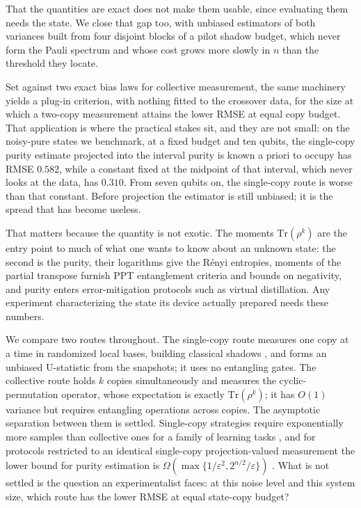 That the quantities are exact does not make them usable, since evaluating them needs the state.
We close that gap too, with unbiased estimators of both variances built from four disjoint blocks
of a pilot shadow budget, which never form the Pauli spectrum and whose cost grows more slowly in
\(n\) than the threshold they locate.

Set against two exact bias laws for collective measurement, the same machinery yields a plug-in
criterion, with nothing fitted to the crossover data, for the size at which a two-copy measurement
attains the lower RMSE at equal copy budget. That application is where the practical stakes sit,
and they are not small: on the noisy-pure states we benchmark, at a fixed budget and ten qubits,
the single-copy purity estimate projected into the interval purity is known a priori to occupy has
RMSE \(0.582\), while a constant fixed at the midpoint of that interval, which never looks at the
data, has \(0.310\). From seven qubits on, the single-copy route is worse than that constant.
Before projection the estimator is still unbiased; it is the spread that has become useless.

That matters because the quantity is not exotic. The moments \(\mathrm{Tr}(\rho^k)\) are the entry
point to much of what one wants to know about an unknown state: the second is the purity, their
logarithms give the R\'enyi entropies, moments of the partial transpose furnish PPT entanglement
criteria and bounds on negativity, and purity enters error-mitigation protocols such as virtual
distillation. Any experiment characterizing the state its device actually prepared needs these
numbers.

We compare two routes throughout. The single-copy route measures one copy at a time in randomized
local bases, building classical shadows \cite{huang2020shadows}, and forms an unbiased U-statistic
from the snapshots; it uses no entangling gates. The collective route holds \(k\) copies
simultaneously and measures the cyclic-permutation operator, whose expectation is exactly
\(\mathrm{Tr}(\rho^k)\); it has \(O(1)\) variance but requires entangling operations across
copies. The asymptotic separation between them is settled. Single-copy strategies require
exponentially more samples than collective ones for a family of learning tasks
\cite{huang2022advantage,chen2022separations}, and for protocols restricted to an identical
single-copy projection-valued measurement the lower bound for purity estimation is
\(\Omega(\max\{1/\varepsilon^2, 2^{n/2}/\varepsilon\})\) \cite{gong2024purity}. What is not settled
is the question an experimentalist faces: at this noise level and this system size, which route
has the lower RMSE at equal state-copy budget?

